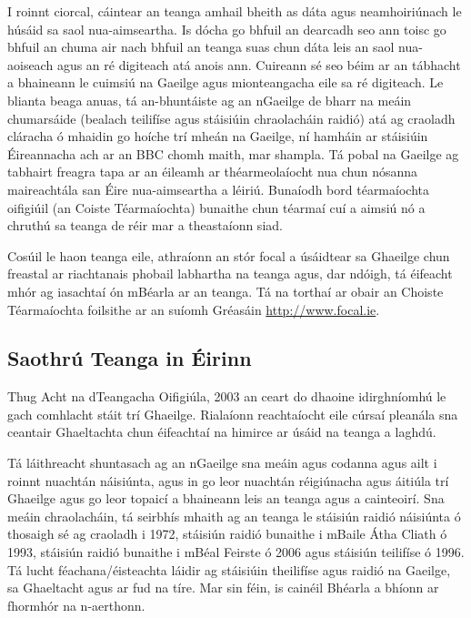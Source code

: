 \begin{multicols}{2}
I roinnt ciorcal, cáintear an teanga amhail bheith as dáta agus neamhoiriúnach le húsáid sa saol nua-aimseartha. Is dócha go bhfuil an dearcadh seo ann toisc go bhfuil an chuma air nach bhfuil an teanga suas chun dáta leis an saol nua-aoiseach agus an ré digiteach atá anois ann. Cuireann sé seo béim ar an tábhacht a bhaineann le cuimsiú na Gaeilge agus mionteangacha eile sa ré digiteach. Le blianta beaga anuas, tá an-bhuntáiste ag an nGaeilge de bharr na meáin chumarsáide (bealach teilifíse agus stáisiúin chraolacháin raidió) atá ag craoladh cláracha ó mhaidin go hoíche trí mheán na Gaeilge, ní hamháin ar stáisiúin Éireannacha ach ar an BBC chomh maith, mar shampla. Tá pobal na Gaeilge ag tabhairt freagra tapa ar an éileamh ar théarmeolaíocht nua chun nósanna maireachtála san Éire nua-aimseartha a léiriú. Bunaíodh bord téarmaíochta oifigiúil (an Coiste Téarmaíochta) bunaithe chun téarmaí cuí a aimsiú nó a chruthú sa teanga de réir mar a theastaíonn siad. 


Cosúil le haon teanga eile, athraíonn an stór focal a úsáidtear sa Ghaeilge chun freastal ar riachtanais phobail labhartha na teanga agus, dar ndóigh, tá éifeacht mhór ag iasachtaí ón mBéarla ar an teanga. Tá na torthaí ar obair an Choiste Téarmaíochta foilsithe ar an suíomh Gréasáin \url{http://www.focal.ie}.

\subsection{Saothrú Teanga in Éirinn}

Thug Acht na dTeangacha Oifigiúla, 2003 an ceart do dhaoine idirghníomhú le gach comhlacht stáit trí Ghaeilge. Rialaíonn reachtaíocht eile cúrsaí pleanála sna ceantair Ghaeltachta chun éifeachtaí na himirce ar úsáid na teanga a laghdú. 


Tá láithreacht shuntasach ag an nGaeilge sna meáin agus codanna agus ailt i roinnt nuachtán náisiúnta, agus in go leor nuachtán réigiúnacha agus áitiúla trí Ghaeilge agus go leor topaicí a bhaineann leis an teanga agus a cainteoirí. Sna meáin chraolacháin, tá seirbhís mhaith ag an teanga le stáisiún raidió náisiúnta ó thosaigh sé ag craoladh i 1972, stáisiún raidió bunaithe i mBaile Átha Cliath ó 1993, stáisiún raidió bunaithe i mBéal Feirste ó 2006 agus stáisiún teilifíse ó 1996. Tá lucht féachana/éisteachta láidir ag stáisiúin theilifíse agus raidió na Gaeilge, sa Ghaeltacht agus ar fud na tíre. Mar sin féin, is cainéil Bhéarla a bhíonn ar fhormhór na n-aerthonn.


\end{multicols}
